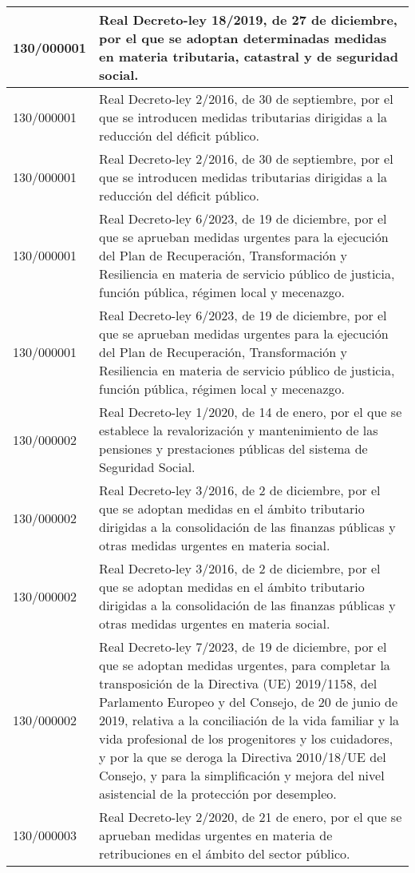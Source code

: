 {\begin{table}[H]
\begin{center}
\begin{tabularx}{\linewidth}{| l | X |}
\hline
130/000001 & Real Decreto-ley 18/2019, de 27 de diciembre, por el que se adoptan determinadas medidas en materia tributaria, catastral y de seguridad social. \\
\hline
130/000001 & Real Decreto-ley 2/2016, de 30 de septiembre, por el que se introducen medidas tributarias dirigidas a la reducción del déficit público. \\
\hline
130/000001 & Real Decreto-ley 2/2016, de 30 de septiembre, por el que se introducen medidas tributarias dirigidas a la reducción del déficit público. \\
\hline
130/000001 & Real Decreto-ley 6/2023, de 19 de diciembre, por el que se aprueban medidas urgentes para la ejecución del Plan de Recuperación, Transformación y Resiliencia en materia de servicio público de justicia, función pública, régimen local y mecenazgo. \\
\hline
130/000001 & Real Decreto-ley 6/2023, de 19 de diciembre, por el que se aprueban medidas urgentes para la ejecución del Plan de Recuperación, Transformación y Resiliencia en materia de servicio público de justicia, función pública, régimen local y mecenazgo. \\
\hline
130/000002 & Real Decreto-ley 1/2020, de 14 de enero, por el que se establece la revalorización y mantenimiento de las pensiones y prestaciones públicas del sistema de Seguridad Social. \\
\hline
130/000002 & Real Decreto-ley 3/2016, de 2 de diciembre, por el que se adoptan medidas en el ámbito tributario dirigidas a la consolidación de las finanzas públicas y otras medidas urgentes en materia social. \\
\hline
130/000002 & Real Decreto-ley 3/2016, de 2 de diciembre, por el que se adoptan medidas en el ámbito tributario dirigidas a la consolidación de las finanzas públicas y otras medidas urgentes en materia social. \\
\hline
130/000002 & Real Decreto-ley 7/2023, de 19 de diciembre, por el que se adoptan medidas urgentes, para completar la transposición de la Directiva (UE) 2019/1158, del Parlamento Europeo y del Consejo, de 20 de junio de 2019, relativa a la conciliación de la vida familiar y la vida profesional de los progenitores y los cuidadores, y por la que se deroga la Directiva 2010/18/UE del Consejo, y para la simplificación y mejora del nivel asistencial de la protección por desempleo. \\
\hline
130/000003 & Real Decreto-ley 2/2020, de 21 de enero, por el que se aprueban medidas urgentes en materia de retribuciones en el ámbito del sector público. \\

\end{tabularx}
\end{center}
\end{table}}
